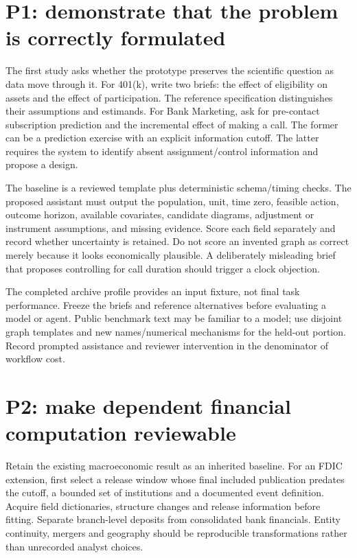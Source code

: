 \hypertarget{p1-demonstrate-that-the-problem-is-correctly-formulated}{%
\section{P1: demonstrate that the problem is correctly
formulated}\label{p1-demonstrate-that-the-problem-is-correctly-formulated}}

The first study asks whether the prototype preserves the scientific
question as data move through it. For 401(k), write two briefs: the
effect of eligibility on assets and the effect of participation. The
reference specification distinguishes their assumptions and estimands.
For Bank Marketing, ask for pre-contact subscription prediction and the
incremental effect of making a call. The former can be a prediction
exercise with an explicit information cutoff. The latter requires the
system to identify absent assignment/control information and propose a
design.

The baseline is a reviewed template plus deterministic schema/timing
checks. The proposed assistant must output the population, unit, time
zero, feasible action, outcome horizon, available covariates, candidate
diagrams, adjustment or instrument assumptions, and missing evidence.
Score each field separately and record whether uncertainty is retained.
Do not score an invented graph as correct merely because it looks
economically plausible. A deliberately misleading brief that proposes
controlling for call duration should trigger a clock objection.

The completed archive profile provides an input fixture, not final task
performance. Freeze the briefs and reference alternatives before
evaluating a model or agent. Public benchmark text may be familiar to a
model; use disjoint graph templates and new names/numerical mechanisms
for the held-out portion. Record prompted assistance and reviewer
intervention in the denominator of workflow cost.

\hypertarget{p2-make-dependent-financial-computation-reviewable}{%
\section{P2: make dependent financial computation
reviewable}\label{p2-make-dependent-financial-computation-reviewable}}

Retain the existing macroeconomic result as an inherited baseline. For
an FDIC extension, first select a release window whose final included
publication predates the cutoff, a bounded set of institutions and a
documented event definition. Acquire field dictionaries, structure
changes and release information before fitting. Separate branch-level
deposits from consolidated bank financials. Entity continuity, mergers
and geography should be reproducible transformations rather than
unrecorded analyst choices.

